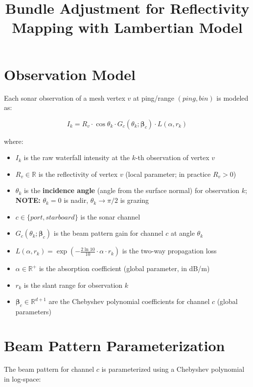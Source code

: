 \documentclass[11pt]{article}
\title{Bundle Adjustment for Reflectivity Mapping with Lambertian Model}
\author{}
\date{}
\begin{document}
\maketitle

\section{Observation Model}

Each sonar observation of a mesh vertex $v$ at ping/range $(ping, bin)$ is modeled as:

\begin{equation*}
I_k = R_v \cdot \cos\theta_k \cdot G_c(\theta_k; \bm{\beta}_c) \cdot L(\alpha, r_k)
\end{equation*}

where:
\begin{itemize}
    \item $I_k$ is the raw waterfall intensity at the $k$-th observation of vertex $v$
    \item $R_v \in \mathbb{R}$ is the reflectivity of vertex $v$ (local parameter; in practice $R_v > 0$)
    \item $\theta_k$ is the \textbf{incidence angle} (angle from the surface normal) for observation $k$; \textbf{NOTE:} $\theta_k = 0$ is nadir, $\theta_k \to \pi/2$ is grazing
    \item $c \in \{port, starboard\}$ is the sonar channel
    \item $G_c(\theta_k; \bm{\beta}_c)$ is the beam pattern gain for channel $c$ at angle $\theta_k$
    \item $L(\alpha, r_k) = \exp\left(-\frac{2\ln 10}{10} \cdot \alpha \cdot r_k\right)$ is the two-way propagation loss
    \item $\alpha \in \mathbb{R}^+$ is the absorption coefficient (global parameter, in dB/m)
    \item $r_k$ is the slant range for observation $k$
    \item $\bm{\beta}_c \in \mathbb{R}^{d+1}$ are the Chebyshev polynomial coefficients for channel $c$ (global parameters)
\end{itemize}

\section{Beam Pattern Parameterization}

The beam pattern for channel $c$ is parameterized using a Chebyshev polynomial in log-space:
\end{document}
